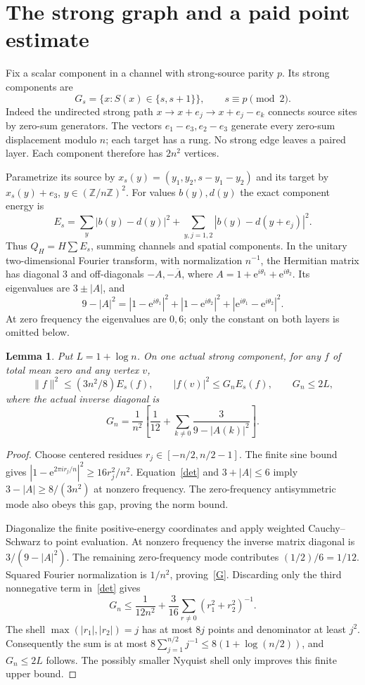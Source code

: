 \documentclass[11pt,a4paper]{article}
\newtheorem{lemma}[theorem]{Lemma}
\newcommand{\Z}{\mathbb Z}
\newcommand{\norm}[1]{\lVert#1\rVert}
\newcommand{\e}{\mathrm e}
\begin{document}
\section{The strong graph and a paid point estimate}\label{green}
Fix a scalar component in a channel with strong-source parity $p$. Its strong
components are
\[
 G_s=\{x:S(x)\in\{s,s+1\}\},\qquad s\equiv p\pmod2.
\]
Indeed the undirected strong path
$x\to x+e_j\to x+e_j-e_k$ connects source sites by zero-sum generators.
The vectors $e_1-e_3,e_2-e_3$ generate every zero-sum displacement modulo $n$;
each target has a rung. No strong edge leaves a paired layer. Each component
therefore has $2n^2$ vertices.

Parametrize its source by $x_s(y)=(y_1,y_2,s-y_1-y_2)$ and its target by
$x_s(y)+e_3$, $y\in(\Z/n\Z)^2$. For values $b(y),d(y)$ the exact component
energy is
\[
 E_s=\sum_y|b(y)-d(y)|^2+
              \sum_{y,j=1,2}|b(y)-d(y+e_j)|^2.
\]
Thus $Q_H=H\sum E_s$, summing channels and spatial components. In the
unitary two-dimensional Fourier transform, with normalization $n^{-1}$,
the Hermitian matrix has diagonal 3 and off-diagonals $-A,-\overline A$,
where $A=1+\e^{i\theta_1}+\e^{i\theta_2}$. Its eigenvalues are $3\pm|A|$,
and
\begin{equation}\label{det}
 9-|A|^2=|1-\e^{i\theta_1}|^2+|1-\e^{i\theta_2}|^2+
                                      |\e^{i\theta_1}-\e^{i\theta_2}|^2.
\end{equation}
At zero frequency the eigenvalues are $0,6$; only the constant on both
layers is omitted below.

\begin{lemma}\label{point}
Put $L=1+\log n$. On one actual strong component, for any $f$ of total mean
zero and any vertex $v$,
\[
 \norm{f}^2\leq(3n^2/8)E_s(f),\qquad
 |f(v)|^2\leq G_nE_s(f),\qquad G_n\leq2L,
\]
where the actual inverse diagonal is
\begin{equation}\label{G}
 G_n=\frac1{n^2}\left[\frac1{12}+
              \sum_{k\ne0}\frac3{9-|A(k)|^2}\right].
\end{equation}
\end{lemma}
\begin{proof}
Choose centered residues $r_j\in[-n/2,n/2-1]$. The finite sine bound gives
$|1-\e^{2\pi i r_j/n}|^2\geq16r_j^2/n^2$. Equation~\eqref{det} and
$3+|A|\leq6$ imply $3-|A|\geq8/(3n^2)$ at nonzero frequency. The
zero-frequency antisymmetric mode also obeys this gap, proving the norm bound.

Diagonalize the finite positive-energy coordinates and apply weighted
Cauchy--Schwarz to point evaluation. At nonzero frequency the inverse matrix
diagonal is $3/(9-|A|^2)$. The remaining zero-frequency mode contributes
$(1/2)/6=1/12$. Squared Fourier normalization is $1/n^2$, proving~\eqref{G}.
Discarding only the third nonnegative term in~\eqref{det} gives
\[
 G_n\leq\frac1{12n^2}+\frac3{16}
                \sum_{r\ne0}(r_1^2+r_2^2)^{-1}.
\]
The shell $\max(|r_1|,|r_2|)=j$ has at most $8j$ points and denominator
at least $j^2$. Consequently the sum is at most
$8\sum_{j=1}^{n/2}j^{-1}\leq8(1+\log(n/2))$, and $G_n\leq2L$ follows.
The possibly smaller Nyquist shell only improves this finite upper bound.
\end{proof}
\end{document}
